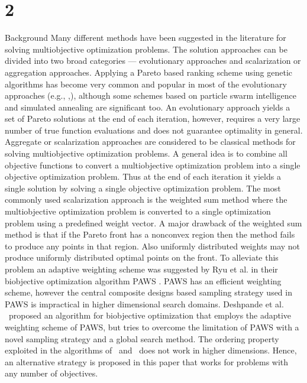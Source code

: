 \section{2}{Background} 
Many different methods have been suggested in the literature for solving 
multiobjective optimization problems. The solution approaches can be divided 
into two broad categories --- evolutionary approaches and scalarization or 
aggregation approaches. Applying a Pareto based ranking scheme using 
genetic algorithms has become very common and popular in most of the 
evolutionary approaches (e.g., \DPAM,), although some schemes based on 
particle swarm intelligence and simulated annealing are significant too. 
An evolutionary approach yields a set of Pareto solutions at the end of each 
iteration, however, requires a very large number of true function evaluations 
and does not guarantee optimality in general. Aggregate or scalarization 
approaches \E are considered to be classical methods for solving 
multiobjective optimization problems. A general idea is to combine all 
objective functions to convert a multiobjective optimization problem into a 
single objective optimization problem. Thus at the end of each iteration it 
yields a single solution by solving a single objective optimization problem.
The most commonly used scalarization approach is the weighted sum method 
where the multiobjective optimization problem is converted to a single 
optimization problem using a predefined weight vector. A major drawback 
of the weighted sum method is that if the Pareto front has a nonconvex 
region then the method fails to produce any points in that region. Also uniformly
distributed weights may not produce uniformly distributed optimal points on the 
front. To alleviate this problem an adaptive weighting scheme was suggested 
by Ryu et al. in their biobjective optimization algorithm PAWS \RKW. PAWS 
has an efficient weighting scheme, however the central composite designs based 
sampling strategy used in PAWS is impractical in higher dimensional search 
domains. Deshpande et al. \DWC\ proposed an algorithm for biobjective 
optimization that employs the adaptive weighting scheme of PAWS, but 
tries to overcome the limitation of PAWS with a novel sampling strategy 
and a global search method. The ordering property exploited in the algorithms 
of \RKW\ and \DWC\ does not work in higher dimensions. Hence, an alternative
strategy is proposed in this paper that works for problems with any number of
objectives. 

